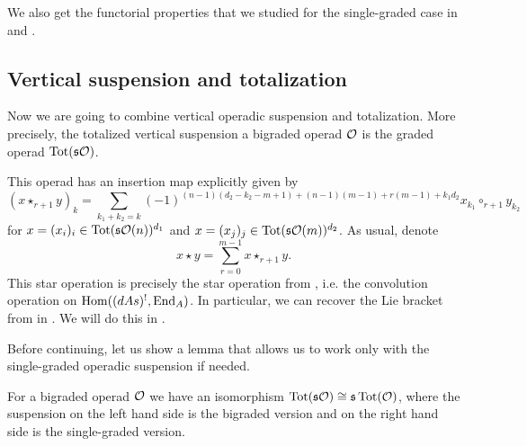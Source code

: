 \documentclass[Thesis.tex]{subfiles}
\begin{document}
We also get the functorial properties that we studied for the single-graded case in  and .

\subsection{Vertical suspension and totalization} 

Now we are going to combine vertical operadic suspension and totalization. More precisely, the totalized vertical suspension a bigraded operad ${\mathcal O}$ is the graded operad $\operatorname{Tot}(\mathfrak{s}{\mathcal O})$. 


This operad has an insertion map explicitly given by
\begin{equation}\label{star}
(x\star_{r+1} y)_k=\sum_{k_1+k_2=k}(-1)^{(n-1)(d_2-k_2-m+1)+(n-1)(m-1)+r(m-1)+k_1d_2}x_{k_1}\circ_{r+1}y_{k_2}
\end{equation}
for $x=(x_i)_i\in \operatorname{Tot}(\mathfrak{s}{\mathcal O}(n))^{d_1}$ and $x=(x_j)_j\in \operatorname{Tot}(\mathfrak{s}{\mathcal O}(m))^{d_2}$. As usual, denote 
\begin{equation}
x\star y=\sum_{r=0}^{m-1}x\star_{r+1}y.
\end{equation}
This star operation is precisely the star operation from \cite[\S 5.1]{LRW}, i.e. the convolution operation on $\operatorname{Hom}((dAs)^{!}, \operatorname{End}_A)$. In particular, we can recover the Lie bracket from in \cite{LRW}. We will do this in .


Before continuing, let us show a lemma that allows us to work only with the single-graded operadic suspension if needed.
\begin{propo}\label{extrasign}
For a bigraded operad ${\mathcal O}$ we have an isomorphism $\operatorname{Tot}(\mathfrak{s}{\mathcal O})\cong \mathfrak{s} \operatorname{Tot}({\mathcal O})$, where the suspension on the left hand side is the bigraded version and on the right hand side is the single-graded version. 
\end{propo}
\end{document}
